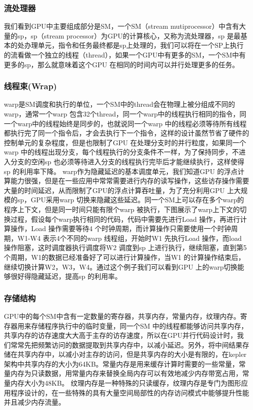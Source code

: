 \subsubsection {流处理器}
我们看到GPU中主要组成部分是SM，一个SM（stream mutiprocessor）中含有大量的sp，sp（stream processor）为GPU的计算核心，又称为流处理器，sp 是最基本的处办理单元，指令和任务最终都是sp上处理的，我们可以将在一个SP上执行的流看做一个独立的线程（thread），如果一个GPU中有更多的SM，一个SM中有更多的sp，那么就意味着这个GPU 在相同的时间内可以并行处理更多的任务。
\subsubsection{线程束(Wrap)}
warp是SM调度和执行的单位，一个SM中的thread会在物理上被分组成不同的warp，通常一个warp 包含32个thread，同一个warp中的线程执行相同的指令，同一个warp中的线程始终是同步的，也就说同一个warp 中的线程必须等待所有线程都执行完了同一个指令后，才会去执行下一个指令，这样的设计虽然节省了硬件的控制单元的复杂程度，但是也限制了GPU 在处理分支时的并行粒度，如果同一个warp 中的线程出现分支，每个线程执行的分支条件不一样，为了保持同步，不进入分支的空闲sp 也必须等待进入分支的线程执行完毕后才能继续执行，这样使得sp 的利用率下降。\newline
warp作为隐藏延迟的基本调度单元，我们知道GPU 的浮点计算能力很强，但是在一些应用中常常需要进行内存的读写操作，这些访存操作需要大量的时间延迟，从而限制了GPU的浮点计算吞吐量，为了充分利用GPU 上大规模的sp，GPU采用warp 切换来隐藏这些延迟。同一个SM上可以存在多个warp的程序上下文，但是同一时间只能有限个warp 被执行，下图展示了warp上下文的切换过程，假设每个warp执行相同的代码，代码中需要先进行Load 操作，再进行计算操作，Load 操作需要等待4 个时钟周期，而计算操作只需要使用一个时钟周期，W1-W4 表示4个不同的warp 线程组，开始时W1 先执行Load 操作，而load 操作阻塞，这时调度器执行调度将W2 调度到sp 上进行执行，继续阻塞，直到第5个周期，W1的数据已经准备好了可以进行计算操作，当W1 的计算操作结束后，继续切换计算W2，W3，W4。通过这个例子我们可以看到GPU 上的warp切换能够很好得隐藏延迟，提高sp 的利用率。\newline
\subsubsection{存储结构}
GPU中的每个SM中含有一定数量的寄存器，共享内存，常量内存，纹理内存。寄存器用来存储程序执行中的临时变量，同一个SM 中的线程都能够访问共享内存，共享内存的访存速度大大高于主存的访存速度，所以在GPU并行代码设计时，我们常常先把频繁访问的数据提取到共享内存中，以减小延迟。另外，将中间结果存储在共享内存中，以减小对主存的访问，但是共享内存的大小是有限的，在kepler架构中共享内存的大小为64KB。常量内存是用来缓存计算时需要的一些常量，常量内存为只读数据，用常量内存来替换全局内存可以有效地减少内存带宽占用，常量内存大小为48KB。 纹理内存是一种特殊的只读缓存，纹理内存是专门为图形应用程序设计的，在一些特殊的具有大量空间局部性的内存访问模式中能够提升性能并且减少内存流量。\newline

